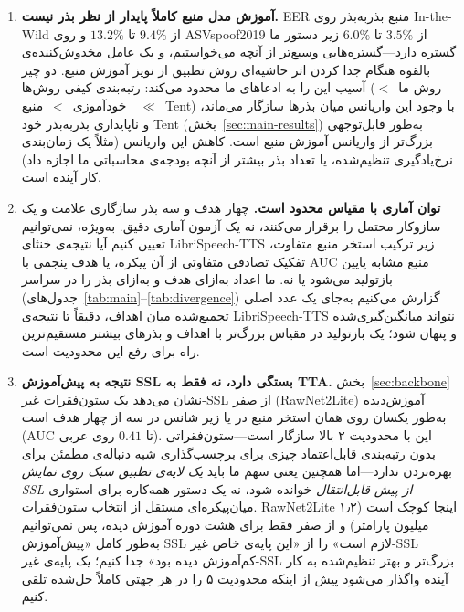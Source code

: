 \documentclass[a4paper,11pt]{article}
\begin{document}
\begin{enumerate}
\item \textbf{آموزش مدل منبع کاملاً پایدار از نظر بذر نیست.} EER منبع
بذر‌به‌بذر روی In-the-Wild از $9.4\%$ تا $13.2\%$ و روی ASVspoof2019 از
$3.5\%$ تا $6.0\%$ زیر دستور ما گستره دارد---گستره‌هایی وسیع‌تر از آنچه
می‌خواستیم، و یک عامل مخدوش‌کننده‌ی بالقوه هنگام جدا کردن اثر حاشیه‌ای
روش تطبیق از نویز آموزش منبع. دو چیز آسیب این را به ادعاهای ما محدود
می‌کند: رتبه‌بندی کیفی روش‌ها (روش ما~$<$~خودآموزی~$<$~منبع~$\ll$~Tent)
با وجود این واریانس میان بذرها سازگار می‌ماند، و ناپایداری بذر‌به‌بذر خود
Tent (بخش~\ref{sec:main-results}) به‌طور قابل‌توجهی بزرگ‌تر از واریانس
آموزش منبع است. کاهش این واریانس (مثلاً یک زمان‌بندی نرخ‌یادگیری تنظیم‌شده،
یا تعداد بذر بیشتر از آنچه بودجه‌ی محاسباتی ما اجازه داد) کار آینده است.

\item \textbf{توان آماری با مقیاس محدود است.} چهار هدف و سه بذر سازگاری
علامت و یک سازوکار محتمل را برقرار می‌کنند، نه یک آزمون آماری دقیق.
به‌ویژه، نمی‌توانیم تعیین کنیم آیا نتیجه‌ی خنثای LibriSpeech-TTS زیر
ترکیب استخر منبع متفاوت، تفکیک تصادفی متفاوتی از آن پیکره، یا هدف پنجمی با
AUC منبع مشابه پایین بازتولید می‌شود یا نه. ما اعداد به‌ازای هدف و به‌ازای
بذر را در سراسر (جدول‌های~\ref{tab:main}--\ref{tab:divergence}) گزارش
می‌کنیم به‌جای یک عدد اصلی تجمیع‌شده میان اهداف، دقیقاً تا نتیجه‌ی
LibriSpeech-TTS نتواند میانگین‌گیری‌شده و پنهان شود؛ یک بازتولید در مقیاس
بزرگ‌تر با اهداف و بذرهای بیشتر مستقیم‌ترین راه برای رفع این محدودیت است.

\item \textbf{نتیجه به پیش‌آموزش SSL بستگی دارد، نه فقط به TTA.}
بخش~\ref{sec:backbone} نشان می‌دهد یک ستون‌فقرات غیر-SSL از صفر
(RawNet2Lite) آموزش‌دیده به‌طور یکسان روی همان استخر منبع در یا زیر شانس
در سه از چهار هدف است (AUC تا $0.41$ روی عربی). این با محدودیت ۲ بالا
سازگار است---ستون‌فقراتی بدون رتبه‌بندی قابل‌اعتماد چیزی برای برچسب‌گذاری
شبه دنباله‌ی مطمئن برای بهره‌بردن ندارد---اما همچنین یعنی سهم ما باید
\emph{یک لایه‌ی تطبیق سبک روی نمایش SSL از پیش قابل‌انتقال} خوانده شود، نه
یک دستور همه‌کاره برای استواری میان‌پیکره‌ای مستقل از انتخاب ستون‌فقرات.
RawNet2Lite اینجا کوچک است (۱٫۲ میلیون پارامتر) و از صفر فقط برای هشت
دوره آموزش دیده، پس نمی‌توانیم به‌طور کامل «پیش‌آموزش SSL لازم است» را از
«این پایه‌ی خاص غیر-SSL کم‌آموزش دیده بود» جدا کنیم؛ یک پایه‌ی غیر-SSL
بزرگ‌تر و بهتر تنظیم‌شده به کار آینده واگذار می‌شود پیش از اینکه محدودیت
۵ را در هر جهتی کاملاً حل‌شده تلقی کنیم.
\end{enumerate}
\end{document}

